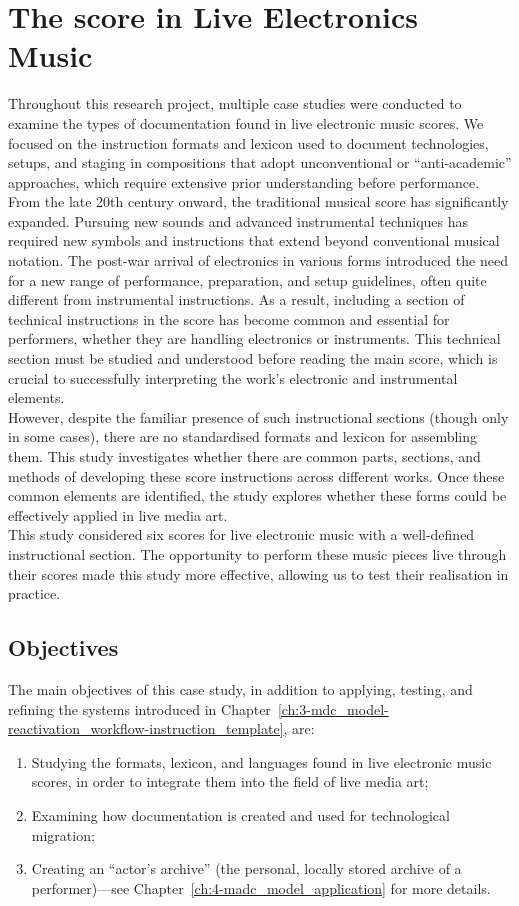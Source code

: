 \chapter{\label{ax:c-the_score_in_live_electronics_music}The score in Live Electronics Music}

Throughout this research project, multiple case studies were conducted to examine the types of documentation found in live electronic music scores. We focused on the instruction formats and lexicon used to document technologies, setups, and staging in compositions that adopt unconventional or ``anti-academic'' approaches, which require extensive prior understanding before performance.\\
From the late 20th century onward, the traditional musical score has significantly expanded. Pursuing new sounds and advanced instrumental techniques has required new symbols and instructions that extend beyond conventional musical notation. The post-war arrival of electronics in various forms introduced the need for a new range of performance, preparation, and setup guidelines, often quite different from instrumental instructions. As a result, including a section of technical instructions in the score has become common and essential for performers, whether they are handling electronics or instruments. This technical section must be studied and understood before reading the main score, which is crucial to successfully interpreting the work's electronic and instrumental elements.\\
However, despite the familiar presence of such instructional sections (though only in some cases), there are no standardised formats and lexicon for assembling them. This study investigates whether there are common parts, sections, and methods of developing these score instructions across different works. Once these common elements are identified, the study explores whether these forms could be effectively applied in live media art.\\
This study considered six scores for live electronic music with a well-defined instructional section. The opportunity to perform these music pieces live through their scores made this study more effective, allowing us to test their realisation in practice.

\section{Objectives}
The main objectives of this case study, in addition to applying, testing, and refining the systems introduced in Chapter~\ref{ch:3-mdc_model-reactivation_workflow-instruction_template}, are:
\begin{enumerate}
    \item Studying the formats, lexicon, and languages found in live electronic music scores, in order to integrate them into the field of live media art;
    \item Examining how documentation is created and used for technological migration;
    \item Creating an ``actor’s archive'' (the personal, locally stored archive of a performer)—see Chapter~\ref{ch:4-madc_model_application} for more details.
\end{enumerate}

